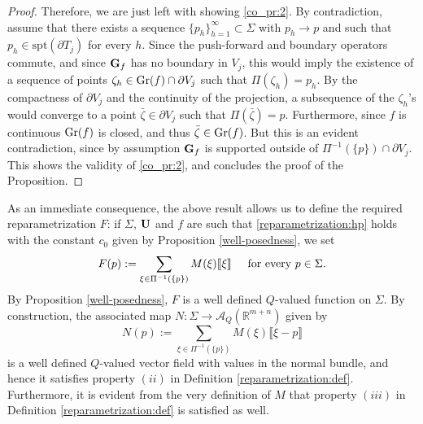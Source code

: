 \documentclass[a4paper,11pt,reqno]{amsart}
\theoremstyle{definition}
\numberwithin{equation}{section}
\numberwithin{subsection}{section}
\newcommand{\R}{\mathbb{R}}
\newcommand{\mres}{\mathbin{\vrule height 1.6ex depth 0pt width
0.13ex\vrule height 0.13ex depth 0pt width 1.3ex}}
\newcommand{\U}{\mathcal{U}}
\newcommand{\A}{\mathcal{A}}
\newcommand{\spt}{\mathrm{spt}}
\begin{document}
\begin{proof}

Therefore, we are just left with showing \eqref{co_pr:2}. By contradiction, assume that there exists a sequence $\{p_{h}\}_{h=1}^{\infty} \subset \Sigma$ with $p_{h} \to p$ and such that $p_{h} \in \spt(\partial T_{j})$ for every $h$. Since the push-forward and boundary operators commute, and since ${\bf G}_{f}$ has no boundary in $V_{j}$, this would imply the existence of a sequence of points $\zeta_{h} \in {\rm Gr}(f) \cap \partial V_{j}$ such that $\Pi(\zeta_{h}) = p_{h}$. By the compactness of $\partial V_j$ and the continuity of the projection, a subsequence of the $\zeta_{h}$'s would converge to a point $\bar{\zeta} \in \partial V_j$ such that $\Pi(\bar{\zeta}) = p$. Furthermore, since $f$ is continuous ${\rm Gr}(f)$ is closed, and thus $\bar{\zeta} \in {\rm Gr}(f)$. But this is an evident contradiction, since by assumption ${\bf G}_{f}$ is supported outside of $\Pi^{-1}(\{p\}) \cap \partial V_j$. This shows the validity of \eqref{co_pr:2}, and concludes the proof of the Proposition.
\end{proof}

As an immediate consequence, the above result allows us to define the required reparametrization $F$: if $\Sigma$, ${\bf U}$ and $f$ are such that \eqref{reparametrization:hp} holds with the constant $c_{0}$ given by Proposition \ref{well-posedness}, we set
\begin{equation} \label{rep:Fdef}
F(p) := \sum_{\xi \in \Pi^{-1}(\{p\})} M(\xi) \llbracket \xi \rrbracket \hspace{0.5cm} \mbox{for every } p \in \Sigma.
\end{equation}  
By Proposition \ref{well-posedness}, $F$ is a well defined $Q$-valued function on $\Sigma$. By construction, the associated map $N \colon \Sigma \to \A_{Q}(\R^{m+n})$ given by
\begin{equation} \label{rep:Ndef}
N(p) := \sum_{\xi \in \Pi^{-1}(\{p\})} M(\xi) \llbracket \xi - p \rrbracket
\end{equation}
is a well defined $Q$-valued vector field with values in the normal bundle, and hence it satisfies property $(ii)$ in Definition \ref{reparametrization:def}. Furthermore, it is evident from the very definition of $M$ that property $(iii)$ in Definition \ref{reparametrization:def} is satisfied as well.
\end{document}
